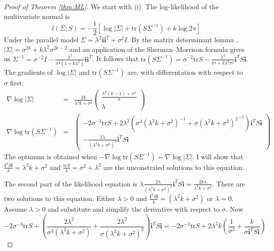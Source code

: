 \documentclass[twoside]{article}
\begin{document}
\begin{proof}[Proof of Theorem \ref{thm:ML}]\label{proof:ML}
We start with (i). The log-likelihood of the multivariate normal is
\begin{equation}
l(\Sigma;S)=-\frac{1}{2}[\log\left|\Sigma\right|+\textrm{tr}(S\Sigma^{-1})+k\log2\pi]
\end{equation}
Under the parallel model $\Sigma=\lambda^{2}\mathbf{i}\mathbf{i}^{T}+\sigma^{2}I$.
By the matrix determinant lemma \citep[][Theorem 18.1.1 (p. 416)]{Harville2008-el}, $\left|\Sigma\right|=\sigma^{2k}+k\lambda^{2}\sigma^{2k-2}$
and an application of the Sherman--Morrison formula \citep{shermanmorrison}
gives us $\Sigma^{-1}=\sigma^{-2}I-\frac{\lambda^{2}}{\sigma^{4}(1+k\lambda^{2})}\mathbf{i}\mathbf{i}^{T}$.
It follows that $\textrm{tr}(S\Sigma^{-1})=\sigma^{-2}\textrm{tr}S-\frac{\lambda^{2}}{\sigma^{4}+k\lambda^{2}\sigma^{2}}\mathbf{i}^{T}S\mathbf{i}$.
The gradients of $\log\left|\Sigma\right|$ and $\textrm{tr}(S\Sigma^{-1})$
are, with differentation with respect to $\sigma$ first:
\begin{eqnarray}
\nabla\log\left|\Sigma\right| & = & \frac{2k}{\lambda^{2}k+\sigma^{2}}\left(\begin{array}{c}
\frac{\lambda^{2}(k-1)+\sigma^{2}}{\sigma}\\
\lambda
\end{array}\right)\\
\nabla\log\textrm{tr}(S\Sigma^{-1}) & = & \left(\begin{array}{c}
-2\sigma^{-3}\textrm{tr}S+2\lambda^{2}({\sigma^{3}(\lambda^{2}k+\sigma^{2})}^{-1}+{\sigma(\lambda^{2}k+\sigma^{2})^{2}}^{-1})\mathbf{i}^{T}S\mathbf{i}\\
-\frac{2\lambda}{(\lambda^{2}k+\sigma^{2})^{2}}\mathbf{i}^{T}S\mathbf{i}
\end{array}\right)\nonumber 
\end{eqnarray}
The optimum is obtained when $-\nabla\log\textrm{tr}(S\Sigma^{-1})=\nabla\log\left|\Sigma\right|$.
I will show that $\frac{\mathbf{i}^{T}S\mathbf{i}}{k}=\lambda^{2}k+\sigma^{2}$
and $\frac{\textrm{tr}S}{k}=\sigma^{2}+\lambda^{2}$ are the unconstraied
solutions to this equation.

The second part of the likelihood equation is $\lambda$$\frac{2\lambda}{(\lambda^{2}k+\sigma^{2})^{2}}\mathbf{i}^{T}S\mathbf{i}=\frac{2k\lambda}{\lambda^{2}k+\sigma^{2}}$.
There are two solutions to this equation. Either $\lambda>0$ and
$\frac{\mathbf{i}^{T}S\mathbf{i}}{k}=(\lambda^{2}k+\sigma^{2})$
or $\lambda=0$. Assume $\lambda>0$ and substitute and simplify the
derivative with respect to $\sigma$. Now
\begin{equation*}
-2\sigma^{-3}\textrm{tr}S+\left(\frac{2\lambda^{2}}{\sigma^{3}(\lambda^{2}k+\sigma^{2})}+\frac{2\lambda^{2}}{\sigma(\lambda^{2}k+\sigma^{2})^{2}}\right)\mathbf{i}^{T}S\mathbf{i} =
-2\sigma^{-3}\textrm{tr}S+2\lambda^{2}k\left(\frac{1}{\sigma^{3}}+\frac{k}{\sigma\mathbf{i}^{T}S\mathbf{i}}\right)
\end{equation*}


\end{proof}
\end{document}
